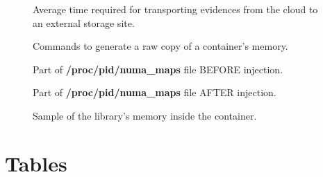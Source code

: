 \documentclass[twocolumn, notitlepage]{bmcart}%
\begin{document}
\begin{backmatter}
    \begin{figure}[h!]
    \caption{ Average time required for transporting evidences from the cloud to an external storage site. }
    \label{fig:evidencia_transporte}
    \end{figure}
	  
    \begin{figure}[h!]
    \caption{ Commands to generate a raw copy of a container's memory. }
    \label{fig:comando-copia}
    \end{figure}
	  
    \begin{figure}[h!]
    \caption{ Part of \textbf{/proc/pid/numa\_maps} file BEFORE injection. }
    \label{fig:antes-injecao}
    \end{figure}

    \begin{figure}[h!]
    \caption{ Part of \textbf{/proc/pid/numa\_maps} file AFTER injection. }
    \label{fig:apos-injecao}
    \end{figure}
	
    \begin{figure}[h!]
    \caption{ Sample of the library's memory inside the container. }
    \label{fig:conteudo-memoria-copia-gdb}
    \end{figure}





\section*{Tables}


\end{backmatter}
\end{document}
